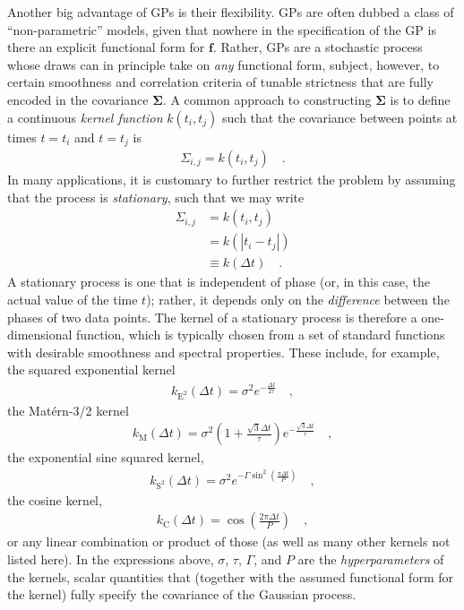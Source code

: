 \documentclass[modern]{aastex62}
\begin{document}
Another big advantage of GPs is their flexibility. GPs are often dubbed
a class of ``non-parametric'' models, given that nowhere in the specification
of the GP is there an explicit functional form for $\mathbf{f}$. Rather, GPs are a stochastic
process whose draws can in principle take on \emph{any} functional form,
subject, however, to certain smoothness and correlation criteria
of tunable strictness
that are fully
encoded in the covariance $\pmb{\Sigma}$. A common approach to constructing
$\pmb{\Sigma}$ is to define a continuous \emph{kernel function} $k(t_i, t_j)$
such that the covariance between points at times $t = t_i$ and $t = t_j$ is
%
\begin{align}
    \Sigma_{i,j} = k(t_i, t_j)
    \quad.
\end{align}
%
In many applications, it is customary to further restrict the problem by
assuming that the process is \emph{stationary}, such that we may write
%
\begin{align}
    \Sigma_{i,j} & = k(t_i, t_j)
    \nonumber                                    \\
                 & = k(\left| t_i - t_j \right|)
    \nonumber                                    \\
                 & \equiv k(\Delta t)
    \quad.
\end{align}
%
A stationary process is one that is independent of phase (or, in this case,
the actual value of the time $t$); rather, it depends only on the \emph{difference}
between the phases of two data points. The kernel of a stationary process is
therefore a one-dimensional function, which is typically chosen from a set of
standard functions with desirable smoothness and spectral properties. These
include, for example, the squared exponential kernel
%
\begin{align}
    k_\mathrm{E^2}(\Delta t) = \sigma^2 e^{-\frac{\Delta t}{2\tau}}
    \quad,
\end{align}
%
the Mat\'ern-3/2 kernel
%
\begin{align}
    k_\mathrm{M}(\Delta t) = \sigma^2 \left( 1 + \frac{\sqrt{3}\Delta t}{\tau} \right) e^{-\frac{\sqrt{3}\Delta t}{\tau}}
    \quad,
\end{align}
%
the exponential sine squared kernel,
%
\begin{align}
    k_\mathrm{S^2}(\Delta t) = \sigma^2 e^{-\Gamma\sin^2\left( \frac{\pi \Delta t}{P} \right)}
    \quad,
\end{align}
%
the cosine kernel,
%
\begin{align}
    k_\mathrm{C}(\Delta t) = \cos\left( \frac{2\pi \Delta t}{P} \right)
    \quad,
\end{align}
%
or any linear combination or product of those (as well as many other kernels not
listed here). In the expressions above, $\sigma$, $\tau$, $\Gamma$, and $P$ are
the \emph{hyperparameters} of the kernels, scalar quantities that (together with
the assumed functional form for the kernel) fully specify the covariance of the
Gaussian process.
\end{document}
